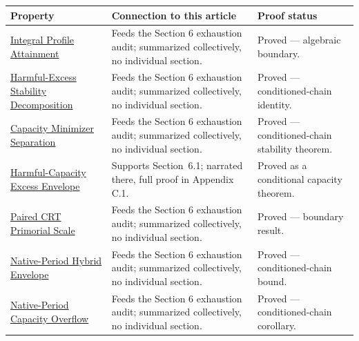 {\raggedright
\begin{longtable}{>{\raggedright\arraybackslash}p{}>{\raggedright\arraybackslash}p{}>{\raggedright\arraybackslash}p{}}
\textbf{Property} & \textbf{Connection to this article} & \textbf{Proof status}\\
\hline
\endhead
\href{https://github.com/thiagomata/prime-numbers/blob/master/properties/sieve-sequence/integral-population-profiles-attain-harmful-energy-threshold.md}{Integral Profile Attainment} & Feeds the Section 6 exhaustion audit; summarized collectively, no individual section. & Proved --- algebraic boundary.\\
\href{https://github.com/thiagomata/prime-numbers/blob/master/properties/sieve-sequence/harmful-excess-energy-exact-stability-decomposition.md}{Harmful-Excess Stability Decomposition} & Feeds the Section 6 exhaustion audit; summarized collectively, no individual section. & Proved --- conditioned-chain identity.\\
\href{https://github.com/thiagomata/prime-numbers/blob/master/properties/sieve-sequence/harmful-capacity-separates-energy-minimizer.md}{Capacity Minimizer Separation} & Feeds the Section 6 exhaustion audit; summarized collectively, no individual section. & Proved --- conditioned-chain stability theorem.\\
\href{https://github.com/thiagomata/prime-numbers/blob/master/properties/sieve-sequence/sharp-harmful-capacity-excess-envelope.md}{Harmful-Capacity Excess Envelope} & Supports Section~6.1; narrated there, full proof in Appendix C.1. & Proved as a conditional capacity theorem.\\
\href{https://github.com/thiagomata/prime-numbers/blob/master/properties/sieve-sequence/paired-harmful-excess-crt-orthogonality-has-primorial-scale.md}{Paired CRT Primorial Scale} & Feeds the Section 6 exhaustion audit; summarized collectively, no individual section. & Proved --- boundary result.\\
\href{https://github.com/thiagomata/prime-numbers/blob/master/properties/sieve-sequence/native-period-bessel-capacity-hybrid-envelope.md}{Native-Period Hybrid Envelope} & Feeds the Section 6 exhaustion audit; summarized collectively, no individual section. & Proved --- conditioned-chain bound.\\
\href{https://github.com/thiagomata/prime-numbers/blob/master/properties/sieve-sequence/native-period-capacity-overflow-quantifies-hybrid-gain.md}{Native-Period Capacity Overflow} & Feeds the Section 6 exhaustion audit; summarized collectively, no individual section. & Proved --- conditioned-chain corollary.\\

\end{longtable}}

